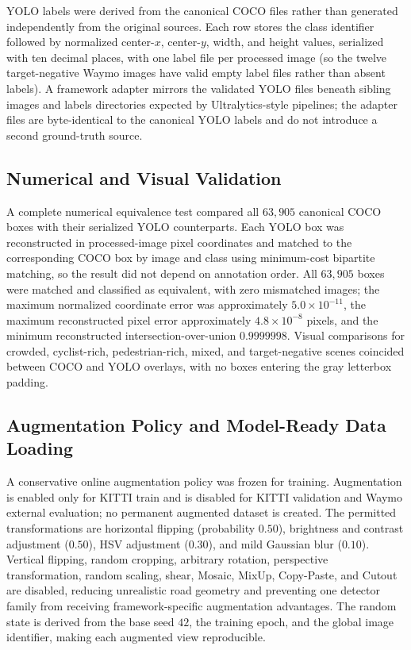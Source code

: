 YOLO labels were derived from the canonical COCO files rather than generated independently
from the original sources. Each row stores the class identifier followed by normalized
center-$x$, center-$y$, width, and height values, serialized with ten decimal places, with
one label file per processed image (so the twelve target-negative Waymo images have valid
empty label files rather than absent labels). A framework adapter mirrors the validated
YOLO files beneath sibling images and labels directories expected by Ultralytics-style
pipelines; the adapter files are byte-identical to the canonical YOLO labels and do not
introduce a second ground-truth source.

\subsection{Numerical and Visual Validation}
\label{sec:methodology_validation}

A complete numerical equivalence test compared all $63{,}905$ canonical COCO boxes with
their serialized YOLO counterparts. Each YOLO box was reconstructed in processed-image
pixel coordinates and matched to the corresponding COCO box by image and class using
minimum-cost bipartite matching, so the result did not depend on annotation order. All
$63{,}905$ boxes were matched and classified as equivalent, with zero mismatched images;
the maximum normalized coordinate error was approximately $5.0\times10^{-11}$, the maximum
reconstructed pixel error approximately $4.8\times10^{-8}$ pixels, and the minimum
reconstructed intersection-over-union $0.9999998$. Visual comparisons for crowded,
cyclist-rich, pedestrian-rich, mixed, and target-negative scenes coincided between COCO
and YOLO overlays, with no boxes entering the gray letterbox padding.

\subsection{Augmentation Policy and Model-Ready Data Loading}
\label{sec:methodology_augmentation}

A conservative online augmentation policy was frozen for training. Augmentation is enabled
only for KITTI train and is disabled for KITTI validation and Waymo external evaluation;
no permanent augmented dataset is created. The permitted transformations are horizontal
flipping (probability $0.50$), brightness and contrast adjustment ($0.50$), HSV adjustment
($0.30$), and mild Gaussian blur ($0.10$). Vertical flipping, random cropping, arbitrary
rotation, perspective transformation, random scaling, shear, Mosaic, MixUp, Copy-Paste,
and Cutout are disabled, reducing unrealistic road geometry and preventing one detector
family from receiving framework-specific augmentation advantages. The random state is
derived from the base seed $42$, the training epoch, and the global image identifier,
making each augmented view reproducible.

